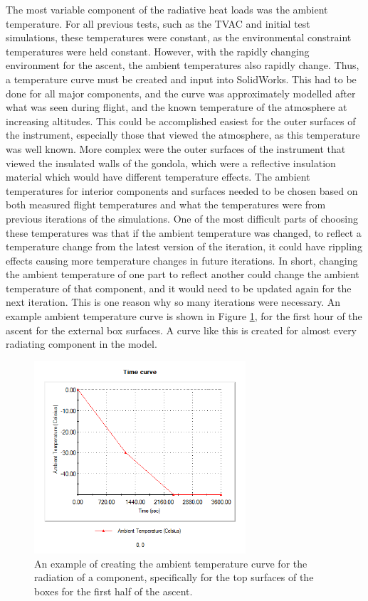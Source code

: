 The most variable component of the radiative heat loads was the ambient temperature. For all previous tests, such as the TVAC and initial test simulations, these temperatures were constant, as the environmental constraint temperatures were held constant. However, with the rapidly changing environment for the ascent, the ambient temperatures also rapidly change. Thus, a temperature curve must be created and input into SolidWorks. This had to be done for all major components, and the curve was approximately modelled after what was seen during flight, and the known temperature of the atmosphere at increasing altitudes. This could be accomplished easiest for the outer surfaces of the instrument, especially those that viewed the atmosphere, as this temperature was well known. More complex were the outer surfaces of the instrument that viewed the insulated walls of the gondola, which were a reflective insulation material which would have different temperature effects. The ambient temperatures for interior components and surfaces needed to be chosen based on both measured flight temperatures and what the temperatures were from previous iterations of the simulations. One of the most difficult parts of choosing these temperatures was that if the ambient temperature was changed, to reflect a temperature change from the latest version of the iteration, it could have rippling effects causing more temperature changes in future iterations. In short, changing the ambient temperature of one part to reflect another could change the ambient temperature of that component, and it would need to be updated again for the next iteration. This is one reason why so many iterations were necessary. An example ambient temperature curve is shown in Figure \ref{fig:ascent_pt1_top_box_rad}, for the first hour of the ascent for the external box surfaces. A curve like this is created for almost every radiating component in the model.

\begin{figure}
    \centering
    \includegraphics[width=0.7\textwidth]{chap4_images/ascent_images/ascent_pt1_top_box_rad.png}
    \caption{An example of creating the ambient temperature curve for the radiation of a component, specifically for the top surfaces of the boxes for the first half of the ascent.}
    \label{fig:ascent_pt1_top_box_rad}
\end{figure}


